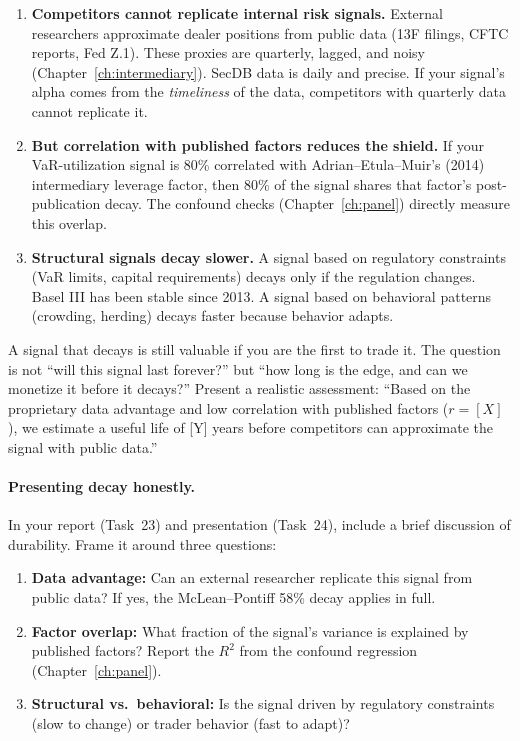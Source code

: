 \begin{enumerate}[leftmargin=1.5em]
  \item \textbf{Competitors cannot replicate internal risk signals.}
    External researchers approximate dealer positions from public data
    (13F filings, CFTC reports, Fed Z.1).  These proxies are quarterly,
    lagged, and noisy (Chapter~\ref{ch:intermediary}).  SecDB data is
    daily and precise.  If your signal's alpha comes from the
    \emph{timeliness} of the data, competitors with quarterly data
    cannot replicate it.
  \item \textbf{But correlation with published factors reduces the
    shield.}  If your VaR-utilization signal is 80\% correlated with
    Adrian--Etula--Muir's (2014) intermediary leverage factor, then 80\%
    of the signal shares that factor's post-publication decay.  The
    confound checks (Chapter~\ref{ch:panel}) directly measure this
    overlap.
  \item \textbf{Structural signals decay slower.}  A signal based on
    regulatory constraints (VaR limits, capital requirements) decays
    only if the regulation changes.  Basel III has been stable since 2013.
    A signal based on behavioral patterns (crowding, herding) decays
    faster because behavior adapts.
\end{enumerate}

\begin{keyidea}
A signal that decays is still valuable if you are the first to trade it.
The question is not ``will this signal last forever?'' but ``how long is
the edge, and can we monetize it before it decays?''  Present a realistic
assessment: ``Based on the proprietary data advantage and low correlation
with published factors ($r = [X]$), we estimate a useful life of [Y]
years before competitors can approximate the signal with public data.''
\end{keyidea}

\paragraph{Presenting decay honestly.}
In your report (Task~23) and presentation (Task~24), include a brief
discussion of durability.  Frame it around three questions:

\begin{enumerate}[leftmargin=1.5em]
  \item \textbf{Data advantage:} Can an external researcher replicate
    this signal from public data?  If yes, the McLean--Pontiff 58\%
    decay applies in full.
  \item \textbf{Factor overlap:} What fraction of the signal's variance
    is explained by published factors?  Report the $R^2$ from the
    confound regression (Chapter~\ref{ch:panel}).
  \item \textbf{Structural vs.\ behavioral:} Is the signal driven by
    regulatory constraints (slow to change) or trader behavior (fast to
    adapt)?
\end{enumerate}

